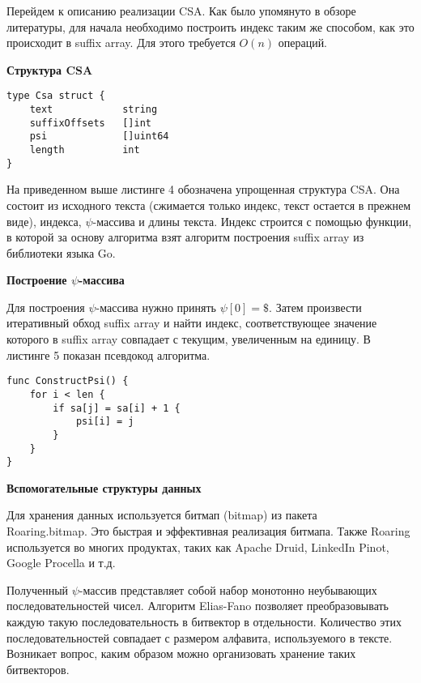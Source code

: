 
Перейдем к описанию реализации CSA. Как было упомянуто в обзоре литературы, для начала необходимо
построить индекс таким же способом, как это происходит в suffix array. Для этого требуется $O(n)$ операций.

\textbf{Структура CSA}

\begin{lstlisting}[caption=CSA structure]
type Csa struct {
	text            string
	suffixOffsets   []int
	psi             []uint64
	length          int
}
\end{lstlisting}

На приведенном выше листинге 4 обозначена упрощенная структура CSA. Она состоит из исходного текста
(сжимается только индекс, текст остается в прежнем виде), индекса, $\psi$-массива и длины текста.
Индекс строится с помощью функции, в которой за основу алгоритма взят алгоритм построения suffix array
из библиотеки языка Go.

\textbf{Построение $\psi$-массива}

Для построения $\psi$-массива нужно принять $\psi[0] = \$$. Затем произвести итеративный обход
suffix array и найти индекс, соответствующее значение которого в suffix array совпадает с текущим,
увеличенным на единицу. В листинге 5 показан псевдокод алгоритма.

\begin{lstlisting}[caption=Построение CSA]
func ConstructPsi() {
	for i < len {
		if sa[j] = sa[i] + 1 {
			psi[i] = j
		}
	}
}
\end{lstlisting}

\textbf{Вспомогательные структуры данных}

Для хранения данных используется битмап (bitmap) из пакета\\ Roaring.bitmap. %
Это быстрая и эффективная реализация битмапа. Также Roaring используется во многих продуктах,
таких как Apache Druid, LinkedIn Pinot, Google Procella и т.д. %

Полученный $\psi$-массив представляет собой набор монотонно неубывающих последовательностей чисел.
Алгоритм Elias-Fano позволяет преобразовывать каждую такую последовательность в битвектор в отдельности.
Количество этих последовательностей совпадает с размером алфавита, используемого в тексте.
Возникает вопрос, каким образом можно организовать хранение таких битвекторов.

